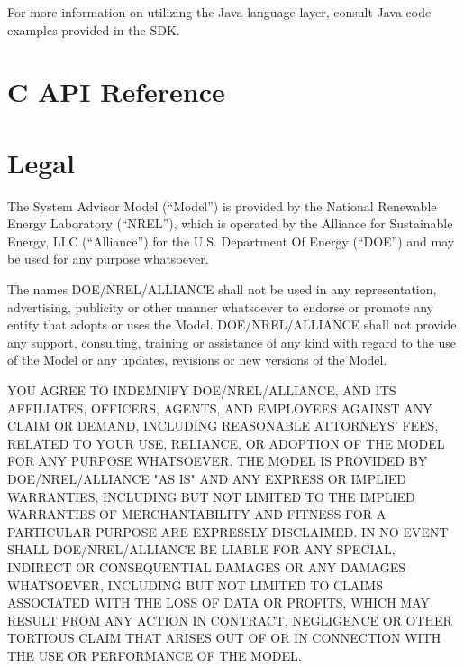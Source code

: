 \documentclass{article}
\begin{document}
For more information on utilizing the Java language layer, consult Java code examples provided in the SDK.  


\section{C API Reference}
\label{sec_api_ref}


\section{Legal}

The System Advisor Model (``Model'') is provided by the National Renewable Energy Laboratory (``NREL''), which is operated by the Alliance for Sustainable Energy, LLC (``Alliance'') for the U.S. Department Of Energy (``DOE'') and may be used for any purpose whatsoever.  

The names DOE/NREL/ALLIANCE shall not be used in any representation, advertising, publicity or other manner whatsoever to endorse or promote any entity that adopts or uses the Model.  DOE/NREL/ALLIANCE shall not provide any support, consulting, training or assistance of any kind with regard to the use of the Model or any updates, revisions or new versions of the Model.

YOU AGREE TO INDEMNIFY DOE/NREL/ALLIANCE, AND ITS AFFILIATES, OFFICERS, AGENTS, AND EMPLOYEES AGAINST ANY CLAIM OR DEMAND, INCLUDING REASONABLE ATTORNEYS' FEES, RELATED TO YOUR USE, RELIANCE, OR ADOPTION OF THE MODEL FOR ANY PURPOSE WHATSOEVER.  THE MODEL IS PROVIDED BY DOE/NREL/ALLIANCE "AS IS" AND ANY EXPRESS OR IMPLIED WARRANTIES, INCLUDING BUT NOT LIMITED TO THE IMPLIED WARRANTIES OF MERCHANTABILITY AND FITNESS FOR A PARTICULAR PURPOSE ARE EXPRESSLY DISCLAIMED.  IN NO EVENT SHALL DOE/NREL/ALLIANCE BE LIABLE FOR ANY SPECIAL, INDIRECT OR CONSEQUENTIAL DAMAGES OR ANY DAMAGES WHATSOEVER, INCLUDING BUT NOT LIMITED TO CLAIMS ASSOCIATED WITH THE LOSS OF DATA OR PROFITS, WHICH MAY RESULT FROM ANY ACTION IN CONTRACT, NEGLIGENCE OR OTHER TORTIOUS CLAIM THAT ARISES OUT OF OR IN CONNECTION WITH THE USE OR PERFORMANCE OF THE MODEL.
\end{document}
